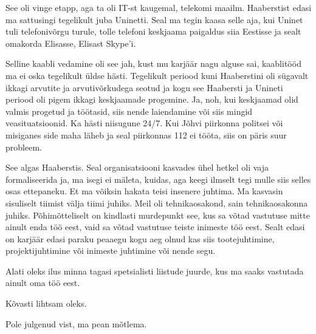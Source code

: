 
See oli vinge etapp, aga ta oli IT-st kaugemal, telekomi maailm. Haaberstist 
edasi ma sattusingi tegelikult juba Uninetti. Seal ma tegin kaasa selle aja, 
kui Uninet tuli telefonivõrgu turule, tolle telefoni keskjaama paigaldus siia 
Eestisse ja sealt omakorda Elisasse, Elisast Skype'i. 


Selline kaabli vedamine oli see jah, kust mu karjäär nagu alguse sai, 
kaablitööd ma ei oska tegelikult üldse hästi. Tegelikult periood kuni Haaberstini oli 
sügavalt ikkagi arvutite ja arvutivõrkudega  seotud ja kogu see Haabersti ja 
Unineti periood oli pigem ikkagi keskjaamade progemine. Ja, noh, kui keskjaamad 
olid valmis progetud ja töötasid, siis nende laiendamine või siis mingid 
veasituatsioonid. Ka hästi niisugune 24/7. Kui Jõhvi piirkonna politsei või 
misiganes side maha läheb ja seal piirkonnas 112 ei tööta, siis on päris suur 
probleem. 


See algas Haaberstis. Seal  organisatsiooni kasvades ühel hetkel oli vaja 
formaliseerida ja, ma isegi ei mäleta, kuidas, aga keegi ilmselt tegi mulle 
siis selles osas ettepaneku. Et ma võiksin hakata teisi insenere juhtima. Ma 
kasvasin sisuliselt tiimist välja tiimi juhiks. Meil oli tehnikaosakond, sain 
tehnikaosakonna juhiks. Põhimõtteliselt on kindlasti murdepunkt  see, kus sa 
võtad vastutuse mitte ainult enda töö eest, vaid sa võtad vastutuse teiste 
inimeste töö eest. Sealt edasi on  karjäär edasi paraku peaaegu kogu aeg 
olnud kas siis tootejuhtimine, projektijuhtimine või inimeste juhtimine või 
nende segu. 


Alati oleks ilus minna tagasi spetsialisti liistude juurde, kus ma saaks 
vastutada ainult oma töö eest. 


Kõvasti lihtsam oleks. 


Pole julgenud vist, ma pean mõtlema. 

